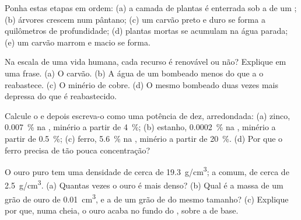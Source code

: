 \begin{exercise}[$\star$]\label{exo:g9:earth-resources:3}
Ponha estas etapas em ordem: (a) a camada de plantas é enterrada sob a
 de um ; (b) árvores crescem num pântano; (c) um carvão preto e
duro se forma a quilômetros de profundidade; (d) plantas mortas se
acumulam na água parada; (e) um carvão marrom e macio se forma.
\end{exercise}

\begin{exercise}[$\star$]\label{exo:g9:earth-resources:4}
Na escala de uma vida humana, cada recurso é renovável ou não? Explique
em uma frase. (a) O carvão. (b) A água de um  bombeado menos do
que a  o reabastece. (c) O minério de cobre. (d) O mesmo 
bombeado duas vezes mais depressa do que é reabastecido.
\end{exercise}

\begin{exercise}[$\star\star$]\label{exo:g9:earth-resources:5}
Calcule o  e depois escreva-o como uma potência de
dez, arredondada: (a) zinco, \qty{0.007}{\%} na , minério a partir
de \qty{4}{\%}; (b) estanho, \qty{0.0002}{\%} na , minério a partir
de \qty{0.5}{\%}; (c) ferro, \qty{5.6}{\%} na , minério a partir de
\qty{20}{\%}. (d) Por que o ferro precisa de tão pouca concentração?
\end{exercise}

\begin{exercise}[$\star\star$]\label{exo:g9:earth-resources:6}
O ouro puro tem uma densidade de cerca de \qty{19.3}{g/cm^3}; a 
comum, de cerca de \qty{2.5}{g/cm^3}. (a) Quantas vezes o ouro é mais
denso? (b) Qual é a massa de um grão de ouro de \qty{0.01}{cm^3}, e a de
um grão de  do mesmo tamanho? (c) Explique por que, numa cheia, o
ouro acaba no fundo do , sobre a  de base.
\end{exercise}

